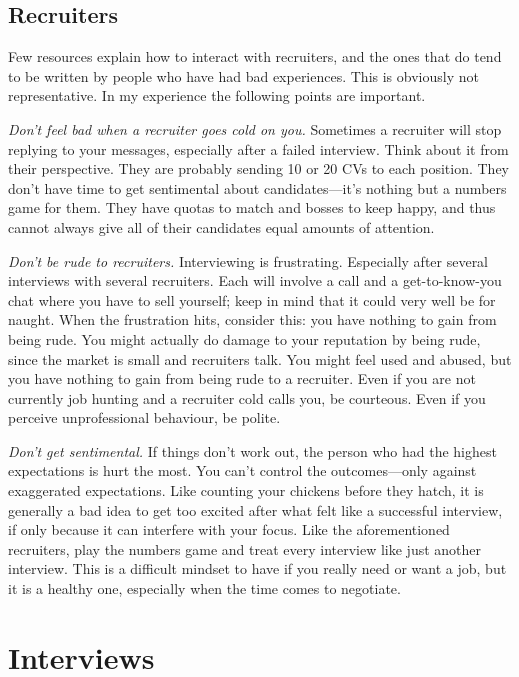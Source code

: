 \documentclass[a4paper]{article}
\begin{document}
{}
\subsection*{Recruiters}
Few resources explain how to interact with recruiters, and the ones that do tend to be written by people who have had bad experiences.
This is obviously not representative.
In my experience the following points are important.

\emph{Don't feel bad when a recruiter goes cold on you.}
Sometimes a recruiter will stop replying to your messages, especially after a failed interview.
Think about it from their perspective.
They are probably sending 10 or 20 CVs to each position.
They don't have time to get sentimental about candidates---it's nothing but a numbers game for them.
They have quotas to match and bosses to keep happy, and thus cannot always give all of their candidates equal amounts of attention.

\emph{Don't be rude to recruiters.}
Interviewing is frustrating. Especially after several interviews with several recruiters.
Each will involve a call and a get-to-know-you chat where you have to sell yourself; keep in mind that it could very well be for naught.
When the frustration hits, consider this:
you have nothing to gain from being rude.
You might actually do damage to your reputation by being rude, since the market is small and recruiters talk.
You might feel used and abused, but
you have nothing to gain from being rude to a recruiter.
Even if you are not currently job hunting and a recruiter cold calls you, be courteous.
Even if you perceive unprofessional behaviour, be polite.

\emph{Don't get sentimental.}
If things don't work out, the person who had the highest expectations is hurt the most.
You can't control the outcomes---only against exaggerated expectations.
Like counting your chickens before they hatch, it is generally a bad idea to get too excited after  what felt like a successful interview, if only because it can interfere with your focus.
Like the aforementioned recruiters, play the numbers game and treat every interview like just another interview.
This is a difficult mindset to have if you really need or want a job, but it is a healthy one, especially when the time comes to negotiate.


\section{Interviews}
\end{document}

